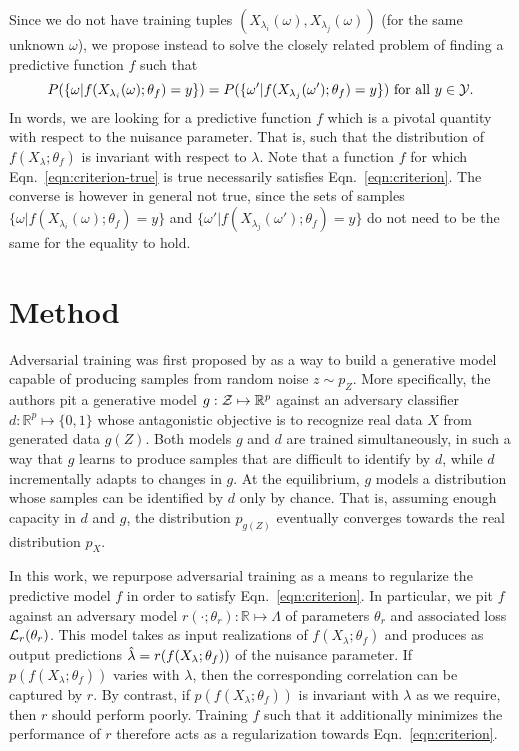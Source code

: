 \documentclass{article}
\theoremstyle{plain}
\begin{document}
Since we do not have training tuples $(X_{\lambda_i}(\omega),
X_{\lambda_j}(\omega))$ (for the same unknown $\omega$), we propose instead to
solve the closely related problem of finding a predictive function $f$ such that
\begin{equation}\label{eqn:criterion}
    P(\{ \omega | f(X_{\lambda_i}(\omega) ; \theta_f) = y \} ) = P( \{ \omega' | f(X_{\lambda_j}(\omega') ; \theta_f) = y\}) \text{ for all $y \in {\cal Y}$}.
\end{equation}
In words, we are looking for a predictive function $f$ which is a pivotal quantity with respect to the nuisance parameter.
That is, such that  the
distribution of $f(X_\lambda; \theta_f)$ is invariant with respect to $\lambda$. Note that a function $f$ for which Eqn.~\ref{eqn:criterion-true} is
true necessarily satisfies Eqn.~\ref{eqn:criterion}. The converse is however in
general not true, since the sets of samples $\{ \omega | f(X_{\lambda_i}(\omega); \theta_f) = y \}$
and $\{ \omega' | f(X_{\lambda_j}(\omega'); \theta_f) = y \}$ do not need to be the same
for the equality to hold.


\section{Method}
\label{sec:method}

Adversarial training was first proposed by \cite{goodfellow2014generative} as a
way to build a generative model capable of producing samples from random noise
$z \sim p_Z$. More specifically, the authors pit a generative model $g: {\cal Z}
\mapsto \mathbb{R}^p$ against an adversary classifier $d : \mathbb{R}^p \mapsto \{
0, 1\}$ whose antagonistic objective is to recognize real data $X$ from generated data $g(Z)$. Both
models $g$ and $d$ are trained simultaneously, in such a way that $g$ learns to
produce samples that are difficult to identify by $d$, while $d$ incrementally
adapts to changes in $g$. At the equilibrium, $g$ models a distribution whose
samples can be identified by $d$ only by chance. That is, assuming enough
capacity in $d$ and  $g$, the distribution $p_{g(Z)}$ eventually converges
towards the real distribution $p_X$.

In this work, we repurpose adversarial training as a means to regularize the
predictive model $f$ in order to satisfy Eqn.~\ref{eqn:criterion}. In
particular, we pit $f$ against an adversary model $r(\cdot ;
\theta_r) : \mathbb{R} \mapsto \Lambda$ of parameters $\theta_r$ and
associated loss ${\cal L}_r(\theta_r)$. This model takes as input realizations of $f(X_\lambda; \theta_f)$
and produces as output predictions $\smash{\hat\lambda} = r(f(X_\lambda; \theta_f))$
of the nuisance parameter. If $p(f(X_\lambda; \theta_f))$ varies with $\lambda$,
then the corresponding correlation can be captured by $r$. By contrast, if
$p(f(X_\lambda; \theta_f))$ is invariant with $\lambda$ as we require, then $r$
should perform poorly. Training $f$ such that it additionally minimizes the performance of $r$
therefore acts as a regularization towards Eqn.~\ref{eqn:criterion}.
\end{document}

